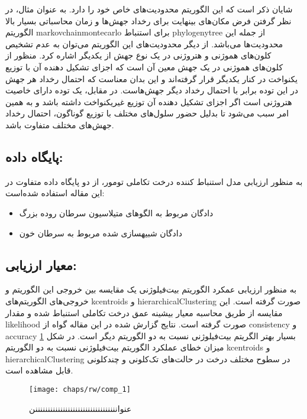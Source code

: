 شایان ذکر است که این الگوریتم محدودیت‌های خاص خود را دارد. به عنوان مثال، در نظر گرفتن فرض مکان‌های بینهایت برای رخداد جهش‌ها و زمان محاسباتی بسیار بالا الگوریتم \gls{markovchainmontecarlo} برای استنباط \gls{phylogenytree} از جمله این محدودیت‌ها می‌باشد. از دیگر محدودیت‌های این الگوریتم می‌توان به عدم تشخیص کلون‌های هموژنی و هتروژنی در یک نوع جهش از یکدیگر اشاره کرد. منظور از کلون‌های هموژنی در یک جهش معین آن است که اجزای تشکیل دهنده آن با توزیع یکنواخت در کنار یکدیگر قرار گرفته‌اند و این بدان معناست که احتمال رخداد هر جهش در این توده برابر با احتمال رخداد دیگر جهش‌هاست. در مقابل، یک توده دارای خاصیت هتروژنی است اگر اجزای تشکیل دهنده آن توزیع غیریکنواخت داشته باشد و به همین امر سبب می‌شود تا بدلیل حضور سلول‌های مختلف با توزیع گوناگون، احتمال رخداد جهش‌های مختلف متفاوت باشد. 



\subsection{پایگاه داده:}

به منظور ارزیابی مدل استنباط کننده درخت تکاملی تومور، از دو پایگاه داده متفاوت در این مقاله استفاده شده‌است: 
\begin{itemize}
	\item دادگان مربوط به الگوهای متیلاسیون سرطان روده بزرگ
	\item دادگان شبیهسازی شده مربوط به سرطان خون
\end{itemize}
 

\subsection{معیار ارزیابی:  }
 
 به منظور ارزیابی عمکرد الگوریتم بیت‌فیلوژنی یک مقایسه بین خروجی این الگوریتم و خروجی‌های الگوریتم‌های \gls{kcentroids} و \gls{hierarchicalClustering} صورت گرفته است. این مقایسه از طریق محاسبه معیار بیشینه عمق درخت تکاملی استنباط شده و مقدار \gls{likelihood} صورت گرفته است. نتایج گزارش شده در این مقاله گواه از \gls{consistency} و \gls{accuracy} بسیار بهتر الگریتم بیت‌فیلوژنی  نسبت به دو الگوریتم دیگر است. در شکل \ref{fig:ch_rw:comp_1} میزان خطای عملکرد الگوریتم بیت‌فیلوژنی نسبت به دو الگوریتم \gls{kcentroids} و \gls{hierarchicalClustering} در سطوح مختلف درخت در حالت‌های تک‌کلونی و چندکلونی قابل مشاهده است.
 
 
 
 

\begin{figure}[!ht]
	\centerline{\texttt{[image: chaps/rw/comp\_1]}}
	\caption{عنوانننننننننننننننننننننننننننننننننن}
	\label{fig:ch_rw:comp_1}
\end{figure}


